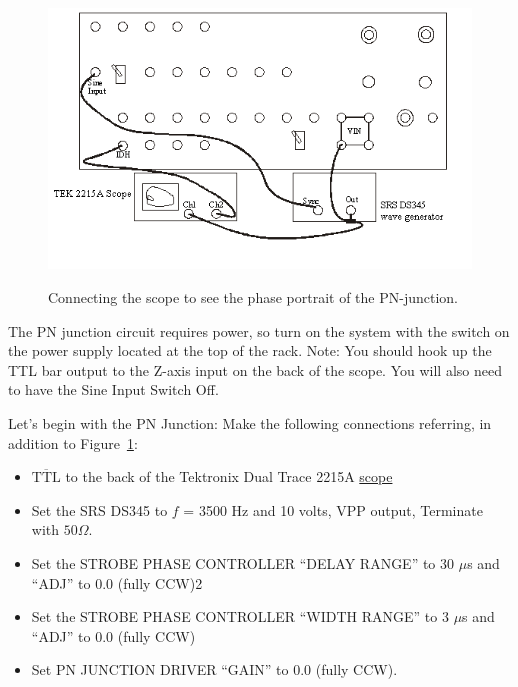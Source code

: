 \documentclass{../lab}
\begin{document}
\begin{figure}[h]
    \centering
    \href{http://experimentationlab.berkeley.edu/sites/default/files/images/Nldimage120.png}{\includegraphics[width=0.7\linewidth]{images/Nldimage120.png}}
    \caption{Connecting the scope to see the phase portrait of the PN-junction.}
    \label{fig:ConnectingTheScope}
\end{figure}

The PN junction circuit requires power, so turn on the system with the switch on the power supply located at the top of the rack. Note: You should hook up the TTL bar output to the Z-axis input on the back of the scope. You will also need to have the Sine Input Switch Off.

Let's begin with the PN Junction: Make the following connections referring, in addition to Figure~\ref{fig:ConnectingTheScope}:

\newpage

\begin{itemize}
    \item $\overline{\text{TTL}}$ to the back of the Tektronix Dual Trace 2215A \href{http://physics111.lib.berkeley.edu/Physics111/Reprints/NLD/NLD_Equipment/01-2215scope.pdf}{scope}

    \item Set the SRS DS345 to $f$ = 3500 Hz and 10 volts, VPP output, Terminate with $50\Omega$.

    \item Set the STROBE PHASE CONTROLLER ``DELAY RANGE'' to 30 $\mu$s and ``ADJ'' to 0.0 (fully CCW)2

    \item Set the STROBE PHASE CONTROLLER ``WIDTH RANGE'' to 3 $\mu$s and ``ADJ'' to 0.0 (fully CCW)

    \item Set PN JUNCTION DRIVER ``GAIN'' to 0.0 (fully CCW).

\end{itemize}
\end{document}
